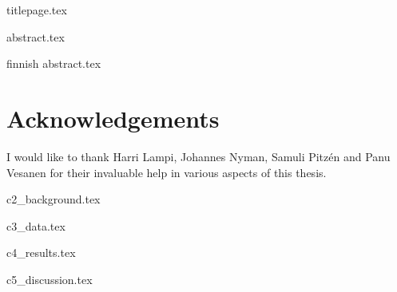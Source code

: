 \documentclass[a4paper,11pt]{article}
\title{\mytitle}
\author{\myname}
\date{11.10.2020} %
\begin{document}
{titlepage.tex}

\newpage
{abstract.tex}

\newpage
\begin{otherlanguage*}{finnish}
{abstract.tex}
\end{otherlanguage*}

\newpage
{}
\thispagestyle{empty} %
\renewcommand*\contentsname{Table of contents} %
\tableofcontents

\newpage
\listoffigures
\thispagestyle{empty}

\listoftables
\thispagestyle{empty}

\newpage
\printglossary[type=\acronymtype,title=List of abbreviations]
\bigskip
\bigskip
\bigskip
\printglossary[nonumberlist,style=alttree,title=Nomenclature]
\thispagestyle{empty}

\newpage
\section*{Acknowledgements}
\thispagestyle{empty}
I would like to thank Harri Lampi, Johannes Nyman, Samuli Pitzén and Panu Vesanen for their invaluable help in various aspects of this thesis.

\newpage
\setcounter{page}{1} %


\newpage
{c2_background.tex}%

\newpage
{c3_data.tex}%

\newpage
{c4_results.tex}%

\newpage
{c5_discussion.tex}%

\newpage
\label{myLastPage} %
\end{document}
